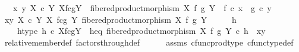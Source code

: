 \begin{isabellebody}
\ \ \ {\isachardoublequoteopen}{\isacharparenleft}{\kern0pt}{\isasymlangle}x{\isacharcomma}{\kern0pt}\ y{\isasymrangle}\ {\isasymin}\isactrlbsub X\ {\isasymtimes}\isactrlsub c\ Y\isactrlesub \ {\isacharparenleft}{\kern0pt}X\isactrlbsub f\isactrlesub {\isasymtimes}\isactrlsub c\isactrlbsub g\isactrlesub Y{\isacharcomma}{\kern0pt}\ \ fibered{\isacharunderscore}{\kern0pt}product{\isacharunderscore}{\kern0pt}morphism\ X\ f\ g\ Y{\isacharparenright}{\kern0pt}{\isacharparenright}{\kern0pt}\ {\isacharequal}{\kern0pt}\ {\isacharparenleft}{\kern0pt}f\ {\isasymcirc}\isactrlsub c\ x\ {\isacharequal}{\kern0pt}\ g\ {\isasymcirc}\isactrlsub c\ y{\isacharparenright}{\kern0pt}{\isachardoublequoteclose}\isanewline
%
\isadelimproof
%
\endisadelimproof
%
\isatagproof
{}\isamarkupfalse%
\isanewline
\ \ \isamarkupfalse%
\ {\isachardoublequoteopen}{\isasymlangle}x{\isacharcomma}{\kern0pt}y{\isasymrangle}\ {\isasymin}\isactrlbsub X\ {\isasymtimes}\isactrlsub c\ Y\isactrlesub \ {\isacharparenleft}{\kern0pt}X\ \isactrlbsub f\isactrlesub {\isasymtimes}\isactrlsub c\isactrlbsub g\isactrlesub \ Y{\isacharcomma}{\kern0pt}\ fibered{\isacharunderscore}{\kern0pt}product{\isacharunderscore}{\kern0pt}morphism\ X\ f\ g\ Y{\isacharparenright}{\kern0pt}{\isachardoublequoteclose}\isanewline
\ \ \isamarkupfalse%
\ \isamarkupfalse%
\ h\ \isanewline
\ \ \ \ h{\isacharunderscore}{\kern0pt}type{\isacharcolon}{\kern0pt}\ {\isachardoublequoteopen}h\ {\isasymin}\isactrlsub c\ X\isactrlbsub f\isactrlesub {\isasymtimes}\isactrlsub c\isactrlbsub g\isactrlesub Y{\isachardoublequoteclose}\ \ h{\isacharunderscore}{\kern0pt}eq{\isacharcolon}{\kern0pt}\ {\isachardoublequoteopen}fibered{\isacharunderscore}{\kern0pt}product{\isacharunderscore}{\kern0pt}morphism\ X\ f\ g\ Y\ {\isasymcirc}\isactrlsub c\ h\ {\isacharequal}{\kern0pt}\ {\isasymlangle}x{\isacharcomma}{\kern0pt}y{\isasymrangle}{\isachardoublequoteclose}\isanewline
\ \ \ \ \isamarkupfalse%
\ relative{\isacharunderscore}{\kern0pt}member{\isacharunderscore}{\kern0pt}def{}\ factors{\isacharunderscore}{\kern0pt}through{\isacharunderscore}{\kern0pt}def\isanewline
\ \ \ \ \isamarkupfalse%
\ assms{\isacharparenleft}{\kern0pt}{}{\isacharcomma}{\kern0pt}{}{\isacharparenright}{\kern0pt}\ cfunc{\isacharunderscore}{\kern0pt}prod{\isacharunderscore}{\kern0pt}type\ cfunc{\isacharunderscore}{\kern0pt}type{\isacharunderscore}{\kern0pt}def\ \isamarkupfalse%

\end{isabellebody}
